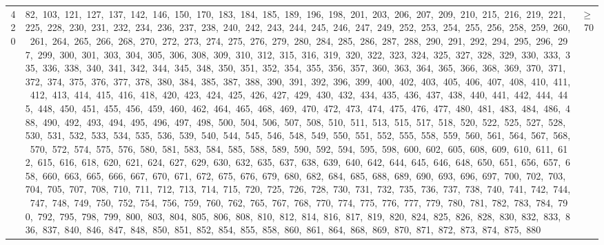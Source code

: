 \begin{longtable}{c|p{}|r}
420 & 82,\ 103,\ 121,\ 127,\ 137,\ 142,\ 146,\ 150,\ 170,\ 183,\ 184,\ 185,\ 189,\ 196,\ 198,\ 201,\ 203,\ 206,\ 207,\ 209,\ 210,\ 215,\ 216,\ 219,\ 221,\ 225,\ 228,\ 230,\ 231,\ 232,\ 234,\ 236,\ 237,\ 238,\ 240,\ 242,\ 243,\ 244,\ 245,\ 246,\ 247,\ 249,\ 252,\ 253,\ 254,\ 255,\ 256,\ 258,\ 259,\ 260,\ 261,\ 264,\ 265,\ 266,\ 268,\ 270,\ 272,\ 273,\ 274,\ 275,\ 276,\ 279,\ 280,\ 284,\ 285,\ 286,\ 287,\ 288,\ 290,\ 291,\ 292,\ 294,\ 295,\ 296,\ 297,\ 299,\ 300,\ 301,\ 303,\ 304,\ 305,\ 306,\ 308,\ 309,\ 310,\ 312,\ 315,\ 316,\ 319,\ 320,\ 322,\ 323,\ 324,\ 325,\ 327,\ 328,\ 329,\ 330,\ 333,\ 335,\ 336,\ 338,\ 340,\ 341,\ 342,\ 344,\ 345,\ 348,\ 350,\ 351,\ 352,\ 354,\ 355,\ 356,\ 357,\ 360,\ 363,\ 364,\ 365,\ 366,\ 368,\ 369,\ 370,\ 371,\ 372,\ 374,\ 375,\ 376,\ 377,\ 378,\ 380,\ 384,\ 385,\ 387,\ 388,\ 390,\ 391,\ 392,\ 396,\ 399,\ 400,\ 402,\ 403,\ 405,\ 406,\ 407,\ 408,\ 410,\ 411,\ 412,\ 413,\ 414,\ 415,\ 416,\ 418,\ 420,\ 423,\ 424,\ 425,\ 426,\ 427,\ 429,\ 430,\ 432,\ 434,\ 435,\ 436,\ 437,\ 438,\ 440,\ 441,\ 442,\ 444,\ 445,\ 448,\ 450,\ 451,\ 455,\ 456,\ 459,\ 460,\ 462,\ 464,\ 465,\ 468,\ 469,\ 470,\ 472,\ 473,\ 474,\ 475,\ 476,\ 477,\ 480,\ 481,\ 483,\ 484,\ 486,\ 488,\ 490,\ 492,\ 493,\ 494,\ 495,\ 496,\ 497,\ 498,\ 500,\ 504,\ 506,\ 507,\ 508,\ 510,\ 511,\ 513,\ 515,\ 517,\ 518,\ 520,\ 522,\ 525,\ 527,\ 528,\ 530,\ 531,\ 532,\ 533,\ 534,\ 535,\ 536,\ 539,\ 540,\ 544,\ 545,\ 546,\ 548,\ 549,\ 550,\ 551,\ 552,\ 555,\ 558,\ 559,\ 560,\ 561,\ 564,\ 567,\ 568,\ 570,\ 572,\ 574,\ 575,\ 576,\ 580,\ 581,\ 583,\ 584,\ 585,\ 588,\ 589,\ 590,\ 592,\ 594,\ 595,\ 598,\ 600,\ 602,\ 605,\ 608,\ 609,\ 610,\ 611,\ 612,\ 615,\ 616,\ 618,\ 620,\ 621,\ 624,\ 627,\ 629,\ 630,\ 632,\ 635,\ 637,\ 638,\ 639,\ 640,\ 642,\ 644,\ 645,\ 646,\ 648,\ 650,\ 651,\ 656,\ 657,\ 658,\ 660,\ 663,\ 665,\ 666,\ 667,\ 670,\ 671,\ 672,\ 675,\ 676,\ 679,\ 680,\ 682,\ 684,\ 685,\ 688,\ 689,\ 690,\ 693,\ 696,\ 697,\ 700,\ 702,\ 703,\ 704,\ 705,\ 707,\ 708,\ 710,\ 711,\ 712,\ 713,\ 714,\ 715,\ 720,\ 725,\ 726,\ 728,\ 730,\ 731,\ 732,\ 735,\ 736,\ 737,\ 738,\ 740,\ 741,\ 742,\ 744,\ 747,\ 748,\ 749,\ 750,\ 752,\ 754,\ 756,\ 759,\ 760,\ 762,\ 765,\ 767,\ 768,\ 770,\ 774,\ 775,\ 776,\ 777,\ 779,\ 780,\ 781,\ 782,\ 783,\ 784,\ 790,\ 792,\ 795,\ 798,\ 799,\ 800,\ 803,\ 804,\ 805,\ 806,\ 808,\ 810,\ 812,\ 814,\ 816,\ 817,\ 819,\ 820,\ 824,\ 825,\ 826,\ 828,\ 830,\ 832,\ 833,\ 836,\ 837,\ 840,\ 846,\ 847,\ 848,\ 850,\ 851,\ 852,\ 854,\ 855,\ 858,\ 860,\ 861,\ 864,\ 868,\ 869,\ 870,\ 871,\ 872,\ 873,\ 874,\ 875,\ 880 & $\ge$ 70 \\

\end{longtable}
